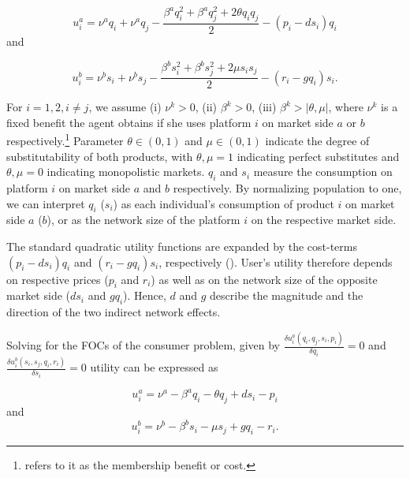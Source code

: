 \documentclass[12pt,a4paper,notitlepage]{article}
\begin{document}
\begin{equation}\label{4.1}
u_i^a = \nu^a q_i + \nu^a q_j-\frac{\beta^a q^2_i+ \beta^a q^2_j+ 2 \theta q_i q_j}{2}-(p_i-d s_i)q_i
\end{equation} and 

\begin{equation}\label{4.2}
u_i^b = \nu^b s_i + \nu^b s_j -\frac{\beta^b s^2_i+ \beta^b s^2_j+2 \mu s_i s_j}{2}-(r_i-g q_i)s_i.
\end{equation}

For $i=1,2, i \neq j$, we assume (i) $\nu^k > 0$, (ii) $\beta^k > 0$, (iii) $\beta^k>\vert\theta,\mu\vert$, where $\nu^k$ is a fixed benefit the agent obtains if she uses platform $i$ on market side $a$ or $b$ respectively.\footnote{\cite{weyl_price_2010} refers to it as the membership benefit or cost.} Parameter $\theta \in (0,1)$ and $\mu \in (0,1)$ indicate the degree of substitutability of both products, with $\theta, \mu = 1$ indicating perfect substitutes and $\theta,\mu = 0$ indicating monopolistic markets. $q_i$ and $s_i$ measure the consumption on platform $i$ on market side $a$ and $b$ respectively. By normalizing  population to one, we can interpret $q_i$ ($s_i$) as each individual’s consumption of product $i$ on market side $a$ ($b$), or as the network size of the platform $i$ on the respective market side.

The standard quadratic utility functions are expanded by the cost-terms $(p_i-d s_i)q_i$ and $(r_i-g q_i)s_i$, respectively (\cite{kind_business_2009}). User's utility therefore depends on respective prices ($p_i$ and $r_i$) as well as on the network size of the opposite market side ($ds_i$ and $gq_i$). Hence, $d$ and $g$ describe the magnitude and the direction of the two indirect network effects. 

Solving for the FOCs of the consumer problem, given by $\frac{\delta u_i^a(q_i,q_j,s_i,p_i)}{\delta q_i}=0$ and  $\frac{\delta u_i^b(s_i,s_j,q_i,r_i)}{\delta s_i}=0$ utility can be expressed as

\begin{equation}\label{utility_a}
u_i^a = \nu^a-\beta^a q_i - \theta q_j +ds_i - p_i
\end{equation}
and
\begin{equation}\label{utility_b}
u_i^b=\nu^b-\beta^b s_i - \mu s_j +gq_i - r_i.
\end{equation} 
\end{document}
